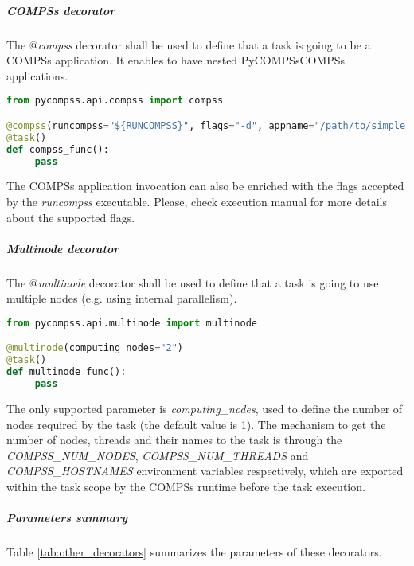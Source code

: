 \subparagraph{COMPSs decorator}
\label{subpar:compss_decorator}

The {\it $@$compss} decorator shall be used to define that a task is going to be a COMPSs application.
It enables to have nested PyCOMPSs\/COMPSs applications.

\begin{lstlisting}[language=python]
from pycompss.api.compss import compss

@compss(runcompss="${RUNCOMPSS}", flags="-d", appname="/path/to/simple_compss_nested.py", computing_nodes="2")
@task()
def compss_func():
     pass
\end{lstlisting}

The COMPSs application invocation can also be enriched with the flags accepted by the {\it runcompss} executable.
Please, check execution manual for more details about the supported flags.

\subparagraph{Multinode decorator}
\label{subpar:multinode_decorator}

The {\it $@$multinode} decorator shall be used to define that a task is going to use multiple nodes
(e.g. using internal parallelism).

\begin{lstlisting}[language=python]
from pycompss.api.multinode import multinode

@multinode(computing_nodes="2")
@task()
def multinode_func():
     pass
\end{lstlisting}

The only supported parameter is {\it computing\_nodes}, used to define the number of nodes required by the task (the default value is 1).
The mechanism to get the number of nodes, threads and their names to the task is through the {\it COMPSS\_NUM\_NODES}, {\it COMPSS\_NUM\_THREADS} and
{\it COMPSS\_HOSTNAMES} environment variables respectively, which are exported within the task scope by the COMPSs runtime before the task execution.

\subparagraph{Parameters summary}

Table \ref{tab:other_decorators} summarizes the parameters of these decorators.

